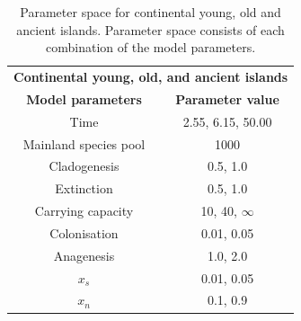 \begin{table}[ht]
    \centering
    \caption{Parameter space for continental young, old and ancient islands. Parameter space consists of each combination of the model parameters.}
    \begin{tabular}{ c | c }
        \multicolumn{2}{c}{\textbf{Continental young, old, and ancient islands}} \\
        \textbf{Model parameters} & \textbf{Parameter value} \\ 
        \hline
        \hline
        Time & 2.55, 6.15, 50.00 \\
        \hline
        Mainland species pool & 1000 \\
        \hline
        Cladogenesis & 0.5, 1.0 \\
        \hline
        Extinction & 0.5, 1.0 \\
        \hline
        Carrying capacity & 10, 40, $\infty$ \\
        \hline
        Colonisation & 0.01, 0.05 \\
        \hline
        Anagenesis & 1.0, 2.0 \\
        \hline
        $x_s$ & 0.01, 0.05 \\
        \hline
        $x_n$ & 0.1, 0.9 \\
    \end{tabular}
    \label{tab:continental}
\end{table}

